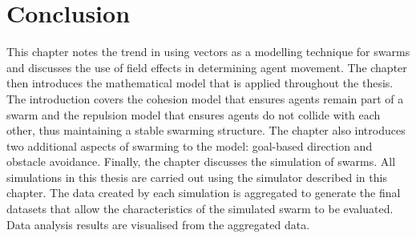 \section{Conclusion}
This chapter notes the trend in using vectors as a modelling technique for
swarms and discusses the use of field effects in determining agent movement.
The chapter then introduces the mathematical model that is applied throughout
the thesis. The introduction covers the cohesion model that ensures agents
remain part of a swarm and the repulsion model that ensures agents do not
collide with each other, thus maintaining a stable swarming structure. The
chapter also introduces two additional aspects of swarming to the model:
goal-based direction and obstacle avoidance.  Finally, the chapter discusses
the simulation of swarms.  All simulations in this thesis are carried out using
the simulator described in this chapter. The data created by each simulation is
aggregated to generate the final datasets that allow the characteristics of the
simulated swarm to be evaluated. Data analysis results are visualised from the
aggregated data. 

